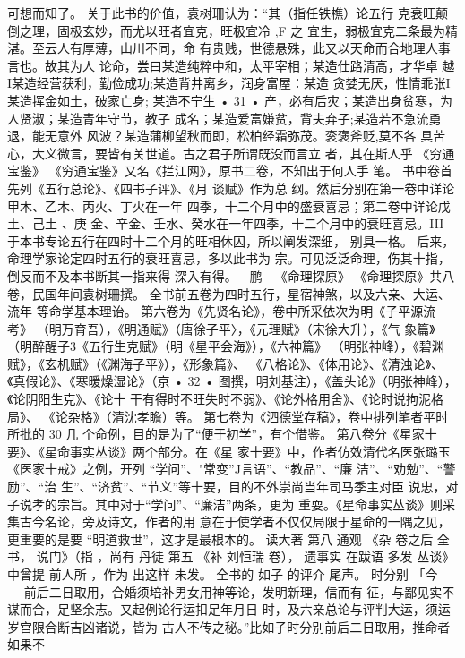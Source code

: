 可想而知了。
关于此书的价值，袁树珊认为：“其（指任铁樵）论五行
克衰旺颠倒之理，固极玄妙，而尤以旺者宜克，旺极宜冷 ,F 之
宜生，弱极宜克二条最为精湛。至云人有厚薄，山川不同，命
有贵贱，世德悬殊，此又以天命而合地理人事言也。故其为人
论命，尝曰某造纯粹中和，太平宰相；某造仕路清高，才华卓
越I某造经营获利，勤俭成功;某造背井离乡，润身富屋：某造
贪婪无厌，性情乖张I 某造挥金如土，破家亡身; 某造不宁生
• 31 •
产，必有后灾；某造出身贫寒，为人贤淑；某造青年守节，教子
成名；某造爱富嫌贫，背夫弃子;某造若不急流勇退，能无意外
风波？某造蒲柳望秋而即，松柏经霜弥茂。衮褒斧贬,莫不各
具苦心，大义微言，要皆有关世道。古之君子所谓既没而言立
者，其在斯人乎
《穷通宝鉴》
《穷通宝鉴》又名《拦江网》，原书二卷，不知出于何人手
笔。
书中卷首先列《五行总论》、《四书子评》、《月 谈赋》作为总
纲。然后分别在第一卷中详论甲木、乙木、丙火、丁火在一年
四季，十二个月中的盛衰喜忌；第二卷中详论戊土、己土 、庚
金、辛金、壬水、癸水在一年四季，十二个月中的衰旺喜忌。III
于本书专论五行在四时十二个月的旺相休囚，所以阐发深细，
别具一格。
后来，命理学家论定四时五行的衰旺喜忌，多以此书为
宗。可见泛泛命理，伤其十指，倒反而不及本书断其一指来得
深入有得。 - 鹏
- 《命理探原》
《命理探原》共八卷，民国年间袁树珊撰。
全书前五卷为四时五行，星宿神煞，以及六亲、大运、流年
等命学基本理诒。
第六卷为《先贤名论》，卷中所采依次为明《子平源流考》
（明万育吾），《明通赋》（唐徐子平〉，《元理赋》（宋徐大升），《气
象篇》（明醉醒子3《五行生克赋》（明《星平会海》），《六神篇》
（明张神峰），《碧渊赋》，《玄机赋》（《渊海子平》），《形象篇》、
《八格论》、《体用论》、《清浊论》、《真假论》、《寒暖燥湿论》（京
• 32 •
图撰，明刘基注），《盖头论》（明张神峰），《论阴阳生克》、《论十
干有得时不旺失时不弱》、《论外格用舍》、《论时说拘泥格局》、
《论杂格》（清沈孝瞻）等。
第七卷为《泗德堂存稿》，卷中排列笔者平时所批的 30 几
个命例，目的是为了“便于初学”，有个借鉴。
第八卷分《星家十要》、《星命事实丛谈》两个部分。在《星
家十要》中，作者仿效清代名医张璐玉《医家十戒》之例，开列
“学问”、"常变”J言语”、“教品”、“廉 洁”、“劝勉”、“警励”、“治
生”、“济贫”、“节义”等十要，目的不外崇尚当年司马季主对臣
说忠，对子说孝的宗旨。其中对于“学问”、“廉洁”两条，更为
重耍。《星命事实丛谈》则采集古今名论，旁及诗文，作者的用
意在于使学者不仅仅局限于星命的一隅之见，更重要的是要
“明道救世”，这才是最根本的。
读大著
第八
通观
《杂
卷之后
全书，
说门》（指
，尚有
丹徒
第五
《补
刘恒瑞
卷），
遗事实
在跋语
多发
丛谈》
中曾提
前人所
，作为
出这样
未发。
全书的
如子
的评介
尾声。
时分别
「今
~
— 前后二日取用，合婚须培补男女用神等论，发明新理，信而有
征，与鄙见实不谋而合，足坚余志。又起例论行运扣足年月日
时，及六亲总论与评判大运，须运岁宫限合断吉凶诸说，皆为
古人不传之秘。”比如子时分别前后二日取用，推命者如果不

